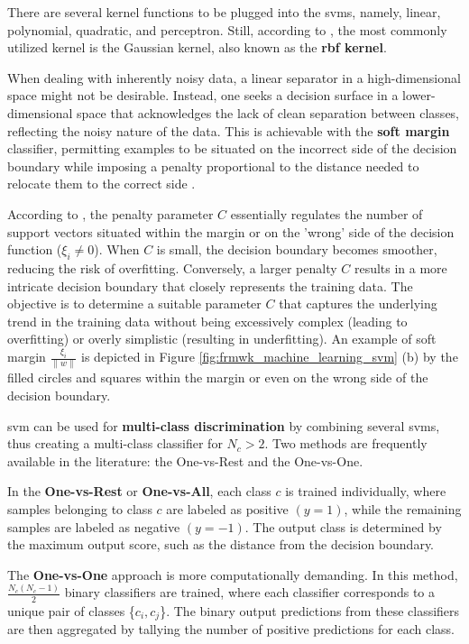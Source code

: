 There are several kernel functions to be plugged into the \gls{svm}s, namely, linear, polynomial, quadratic, and perceptron. Still, according to \textcite{Goodfellow2016}, the most commonly utilized kernel is the Gaussian kernel, also known as the \textbf{\gls{rbf} kernel}.

When dealing with inherently noisy data, a linear separator in a high-dimensional space might not be desirable. Instead, one seeks a decision surface in a lower-dimensional space that acknowledges the lack of clean separation between classes, reflecting the noisy nature of the data. This is achievable with the \textbf{soft margin} classifier, permitting examples to be situated on the incorrect side of the decision boundary while imposing a penalty proportional to the distance needed to relocate them to the correct side \cite{Russel2010}.

According to \textcite{Rothmund2018}, the penalty parameter $C$ essentially regulates the number of support vectors situated within the margin or on the 'wrong' side of the decision function ($\xi_i \neq 0$). When $C$ is small, the decision boundary becomes smoother, reducing the risk of overfitting. Conversely, a larger penalty $C$ results in a more intricate decision boundary that closely represents the training data. The objective is to determine a suitable parameter $C$ that captures the underlying trend in the training data without being excessively complex (leading to overfitting) or overly simplistic (resulting in underfitting). An example of soft margin $\frac{\xi_i}{\parallel w \parallel}$ is depicted in Figure \ref{fig:frmwk_machine_learning_svm} (b) by the filled circles and squares within the margin or even on the wrong side of the decision boundary.

\gls{svm} can be used for \textbf{multi-class discrimination} by combining several \gls{svm}s, thus creating a multi-class classifier for $N_c > 2$. Two methods are frequently available in the literature: the One-vs-Rest and the One-vs-One.

In the \textbf{One-vs-Rest} or \textbf{One-vs-All}, each class $c$ is trained individually, where samples belonging to class $c$ are labeled as positive $(y = 1)$, while the remaining samples are labeled as negative $(y = -1)$. The output class is determined by the maximum output score, such as the distance from the decision boundary.

The \textbf{One-vs-One} approach is more computationally demanding. In this method, $\frac{N_c(N_c-1)}{2}$ binary classifiers are trained, where each classifier corresponds to a unique pair of classes \{$c_i, c_j$\}. The binary output predictions from these classifiers are then aggregated by tallying the number of positive predictions for each class.

